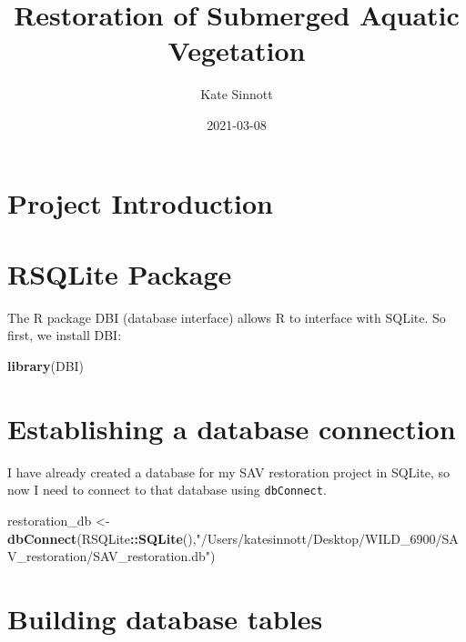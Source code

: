\documentclass[
]{book}
\title{Restoration of Submerged Aquatic Vegetation}
\author{Kate Sinnott}
\date{2021-03-08}
\newenvironment{Shaded}{\begin{snugshade}}{\end{snugshade}}
\newcommand{\KeywordTok}[1]{\textcolor[rgb]{0.13,0.29,0.53}{\textbf{#1}}}
\newcommand{\NormalTok}[1]{#1}
\newcommand{\OperatorTok}[1]{\textcolor[rgb]{0.81,0.36,0.00}{\textbf{#1}}}
\newcommand{\StringTok}[1]{\textcolor[rgb]{0.31,0.60,0.02}{#1}}
\begin{document}
\maketitle

{
\setcounter{tocdepth}{1}
\tableofcontents
}
\hypertarget{project-introduction}{%
\chapter{Project Introduction}\label{project-introduction}}

\hypertarget{rsqlite-package}{%
\chapter{RSQLite Package}\label{rsqlite-package}}

The R package DBI (database interface) allows R to interface with SQLite. So first,
we install DBI:

\begin{Shaded}
\begin{Highlighting}[]
\KeywordTok{library}\NormalTok{(DBI)}
\end{Highlighting}
\end{Shaded}

\hypertarget{establishing-a-database-connection}{%
\chapter{Establishing a database connection}\label{establishing-a-database-connection}}

I have already created a database for my SAV restoration project in SQLite,
so now I need to connect to that database using \texttt{dbConnect}.

\begin{Shaded}
\begin{Highlighting}[]
\NormalTok{restoration_db <-}\StringTok{ }\KeywordTok{dbConnect}\NormalTok{(RSQLite}\OperatorTok{::}\KeywordTok{SQLite}\NormalTok{(),}\StringTok{"/Users/katesinnott/Desktop/WILD_6900/SAV_restoration/SAV_restoration.db"}\NormalTok{)}
\end{Highlighting}
\end{Shaded}

\hypertarget{building-database-tables}{%
\chapter{Building database tables}\label{building-database-tables}}
\end{document}
